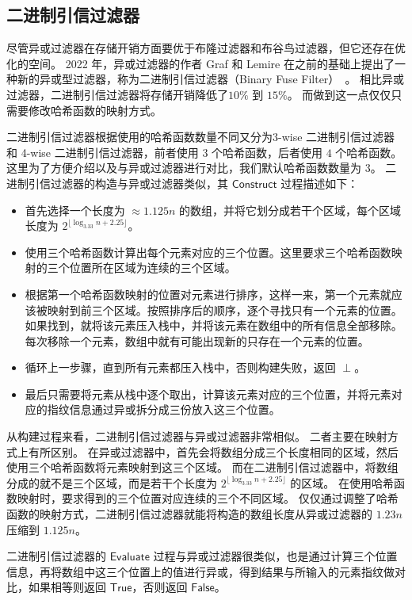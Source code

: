 \subsection{二进制引信过滤器}

尽管异或过滤器在存储开销方面要优于布隆过滤器和布谷鸟过滤器，但它还存在优化的空间。
2022 年，异或过滤器的作者 Graf 和 Lemire 在之前的基础上提出了一种新的异或型过滤器，称为二进制引信过滤器（Binary Fuse Filter）~\cite{graf2022binary}。
相比异或过滤器，二进制引信过滤器将存储开销降低了$10\%$ 到 $15\%$。
而做到这一点仅仅只需要修改哈希函数的映射方式。

二进制引信过滤器根据使用的哈希函数数量不同又分为3-wise 二进制引信过滤器和 4-wise 二进制引信过滤器，前者使用 3 个哈希函数，后者使用 $4$ 个哈希函数。
这里为了方便介绍以及与异或过滤器进行对比，我们默认哈希函数数量为 $3$。
二进制引信过滤器的构造与异或过滤器类似，其 $\mathsf{Construct}$ 过程描述如下：
\begin{itemize}
  \item 首先选择一个长度为 $\approx 1.125 n$ 的数组，并将它划分成若干个区域，每个区域长度为 $2^{\lfloor \log_{3.33}n + 2.25\rfloor}$。
  \item 使用三个哈希函数计算出每个元素对应的三个位置。这里要求三个哈希函数映射的三个位置所在区域为连续的三个区域。
  \item 根据第一个哈希函数映射的位置对元素进行排序，这样一来，第一个元素就应该被映射到前三个区域。按照排序后的顺序，逐个寻找只有一个元素的位置。如果找到，就将该元素压入栈中，并将该元素在数组中的所有信息全部移除。每次移除一个元素，数组中就有可能出现新的只存在一个元素的位置。
  \item 循环上一步骤，直到所有元素都压入栈中，否则构建失败，返回 $\perp$。
  \item 最后只需要将元素从栈中逐个取出，计算该元素对应的三个位置，并将元素对应的指纹信息通过异或拆分成三份放入这三个位置。
\end{itemize}
从构建过程来看，二进制引信过滤器与异或过滤器非常相似。
二者主要在映射方式上有所区别。
在异或过滤器中，首先会将数组分成三个长度相同的区域，然后使用三个哈希函数将元素映射到这三个区域。
而在二进制引信过滤器中，将数组分成的就不是三个区域，而是若干个长度为 $2^{\lfloor \log_{3.33}n + 2.25\rfloor}$ 的区域。
在使用哈希函数映射时，要求得到的三个位置对应连续的三个不同区域。
仅仅通过调整了哈希函数的映射方式，二进制引信过滤器就能将构造的数组长度从异或过滤器的 $1.23n$ 压缩到 $1.125n$。

二进制引信过滤器的 $\mathsf{Evaluate}$ 过程与异或过滤器很类似，也是通过计算三个位置信息，再将数组中这三个位置上的值进行异或，得到结果与所输入的元素指纹做对比，如果相等则返回 $\mathsf{True}$，否则返回 $\mathsf{False}$。

